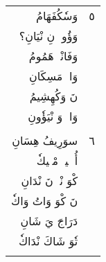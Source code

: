 \documentclass[a4paper, 12pt]{report}
\begin{document}
\begin{longtable}{rl}
\textarabic{وَسٗكُفَهَامُ} & \textarabic{٥} \\* 
\textarabic{وَؤُوزٖ نِ نْيَانِ؟} &  \\* 
\textarabic{وَفَانْيٖ هَمُومُ} &  \\* 
\textarabic{وَاجٖ مَسِكَانِ} &  \\* 
\textarabic{نَ وَكُهِشِيمُ} &  \\* 
\textarabic{وَاوٖ وَ نْيَؤٗونِ} &  \\* 
\\[8mm] 

\textarabic{سوَرِيفُ هِسَانِ} & \textarabic{٦} \\* 
\textarabic{أُوٖكٖيوٖ مْبٖيكٗ} &  \\* 
\textarabic{كْوَ نْدٖ نَ نْدَانِ} &  \\* 
\textarabic{نَ كْوَ وَاتُ وَاكٗ} &  \\* 
\textarabic{دَرَاجَ يَ شَانِ} &  \\* 
\textarabic{تٗوَ شَاكَ نْدَاكٗ} &  \\* 
\\[8mm] 

\end{longtable}

\begin{longtable}{r}
 \\  %

\end{longtable}
\end{document}
